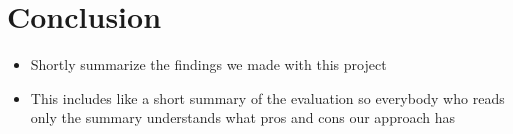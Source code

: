 \section{Conclusion}

\begin{itemize}
\item Shortly summarize the findings we made with this project
\item This includes like a short summary of the evaluation so everybody who reads only the summary understands what pros and cons our approach has
\end{itemize}
